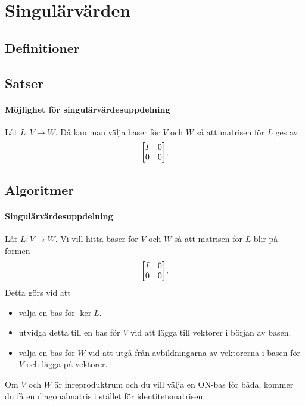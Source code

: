 \section{Singulärvärden}

\subsection{Definitioner}

\subsection{Satser}

\paragraph{Möjlighet för singulärvärdesuppdelning}
Låt $L: V\to W$. Då kan man välja baser för $V$ och $W$ så att matrisen för $L$ ges av
\begin{align*}
	\mqty[
		I & 0 \\
		0 & 0
	].
\end{align*}

\subsection{Algoritmer}

\paragraph{Singulärvärdesuppdelning}
Låt $L: V\to W$. Vi vill hitta baser för $V$ och $W$ så att matrisen för $L$ blir på formen
\begin{align*}
	\mqty[
		I & 0 \\
		0 & 0
	].
\end{align*}
Detta görs vid att
\begin{itemize}
	\item välja en bas för $\ker{L}$.
	\item utvidga detta till en bas för $V$ vid att lägga till vektorer i början av basen.
	\item välja en bas för $W$ vid att utgå från avbildningarna av vektorerna i basen för $V$ och lägga på vektorer.
\end{itemize}

Om $V$ och $W$ är inreproduktrum och du vill välja en ON-bas för båda, kommer du få en diagonalmatris i stället för identitetsmatrisen.